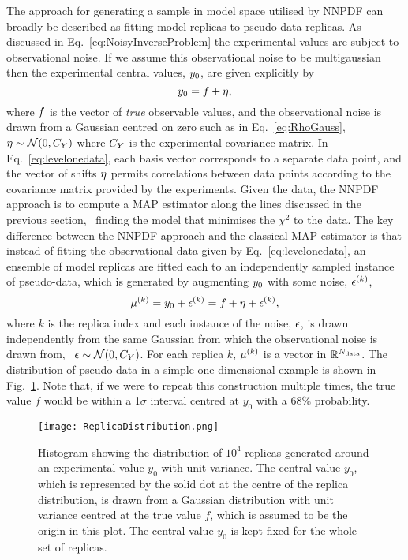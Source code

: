 The approach for generating a sample in model space utilised by NNPDF can
broadly be described as fitting model replicas to pseudo-data replicas. As
discussed in Eq.~\ref{eq:NoisyInverseProblem} the experimental values are
subject to observational noise. If we assume this observational noise to be
multigaussian then the experimental central values, $y_0$, are given
explicitly by
\begin{equation}
    \label{eq:levelonedata}
    y_0 = f + \eta,
\end{equation}
where $f$ is the vector of {\em true} observable values, and the
observational noise is drawn from a Gaussian centred on zero such as in
Eq.~\ref{eq:RhoGauss}, \ie\ $\eta \sim \mathcal{N}(0, C_{Y})$ where
$C_{Y}$ is the experimental covariance matrix. In
Eq.~\ref{eq:levelonedata}, each basis vector corresponds to a separate data
point, and the vector of shifts $\eta$ permits correlations between data
points according to the covariance matrix provided by the experiments. Given the
data, the NNPDF approach is to compute a MAP estimator along the lines discussed
in the previous section, \ie\ finding the model that minimises the $\chi^2$ to
the data. The key difference between the NNPDF approach and the classical MAP
estimator is that instead of fitting the observational data given by
Eq.~\ref{eq:levelonedata}, an ensemble of model replicas are fitted each to an
independently sampled instance of pseudo-data, which is generated by augmenting
$y_0$ with some noise, $\epsilon^{(k)}$,
\begin{equation}
    \label{eq:leveltwodata1}
    \mu^{(k)} = y_0 + \epsilon^{(k)}
    = f + \eta + \epsilon^{(k)},
\end{equation}
where $k$ is the replica index and each instance of the noise, $\epsilon$, is
drawn independently from the same Gaussian from which the observational noise is
drawn from, \ie\ $\epsilon \sim \mathcal{N}(0, C_{Y})$. For each replica
$k$, $\mu^{(k)}$ is a vector in $\mathbb{R}^{N_{\rm data}}$. The distribution of
pseudo-data in a simple one-dimensional example is shown in
Fig.~\ref{fig:DistRep}. Note that, if we were to repeat this construction
multiple times, the true value $f$ would be within a 1$\sigma$ interval centred
at $y_0$ with a 68\% probability.
\begin{figure}
    \centering
    \texttt{[image: ReplicaDistribution.png]}
    \caption{Histogram showing the distribution of $10^4$ replicas generated
    around an experimental value $y_0$ with unit variance. The central value
    $y_0$, which is represented by the solid dot at the centre of the replica
    distribution, is drawn from a Gaussian distribution with unit variance
    centred at the true value $f$, which is assumed to be the origin in this
    plot. The central value $y_0$ is kept fixed for the whole set of
    replicas.\label{fig:DistRep}}
\end{figure}

